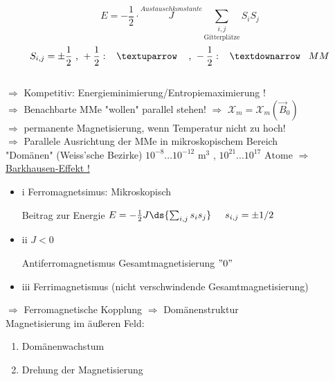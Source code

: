 \begin{itemize}
	$$ E = -\frac{1}{2} \cdot \overset{Austauschkonstante}{J} \underset{\text{Gitterplätze}}{\sum_{i,j}} S_i S_j $$
	$$ S_{i,j} = \pm \frac{1}{2}\text{ , } +\frac{1}{2}: \hspace{3mm}\textuparrow \hspace{3mm} \text{ , } -\frac{1}{2}: \hspace{3mm}\textdownarrow \hspace{3mm} MM$$\\
	$ \Rightarrow $ Kompetitiv: Energieminimierung/Entropiemaximierung !\\
	$ \Rightarrow $ Benachbarte MMe "wollen" parallel stehen!
	$ \Rightarrow $ $ \mathcal{X}_m =\mathcal{X}_m (\vec{B}_0) $ \\
	$ \Rightarrow $ permanente Magnetisierung, wenn Temperatur nicht zu hoch! \\
	$ \Rightarrow $ Parallele Ausrichtung der MMe in mikroskopischem Bereich\\
	\hspace{5mm}"Domänen" (Weiss'sche Bezirke) \hspace{3mm} $ 10^{-8} ... 10^{-12} \text{ m}^3 $ \hspace{2mm},\hspace{2mm} $ 10^{21}...10^{17} \text{ Atome} $
	$ \Rightarrow $ \underline{Barkhausen-Effekt !}
\end{itemize}
\newpage
\begin{itemize}
	\item i Ferromagnetsimus: Mikroskopisch \\
	\bild
	
	Beitrag zur Energie $ E= - \frac{1}{2}J \ds{\sum_{i,j} s_i s_j} \hspace{5mm} s_{i,j} = \pm 1/2 $ \\
	\item ii $ J<0 $ \\
	\bild
	
	Antiferromagnetismus
	Gesamtmagnetisierung $ "0" $
	\item iii
	\bild
	Ferrimagnetismus (nicht verschwindende Gesamtmagnetisierung)
\end{itemize}
$ \Rightarrow $ Ferromagnetische Kopplung $ \Rightarrow $ Domänenstruktur\\ \break
Magnetisierung im äußeren Feld:
\bild

\begin{enumerate}
	\item Domänenwachstum
	\item Drehung der Magnetisierung
\end{enumerate}

